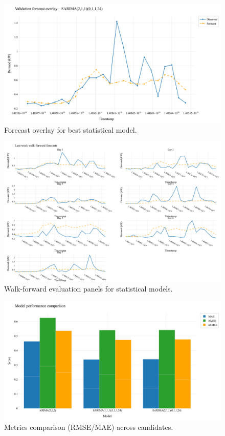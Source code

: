 \documentclass[12pt,a4paper]{article}
\begin{document}
\begin{figure}[H]
  \centering
  \includegraphics[width=\linewidth]{stats_forecast_overlay_best.png}
  \caption{Forecast overlay for best statistical model.}
  \label{fig:stats_best}
\end{figure}

\begin{figure}[H]
  \centering
  \includegraphics[width=\linewidth]{stats_walkforward_panels.png}
  \caption{Walk-forward evaluation panels for statistical models.}
  \label{fig:walkforward}
\end{figure}

\begin{figure}[H]
  \centering
  \includegraphics[width=\linewidth]{stats_metrics_bar.png}
  \caption{Metrics comparison (RMSE/MAE) across candidates.}
  \label{fig:stats_metrics}
\end{figure}
\end{document}
